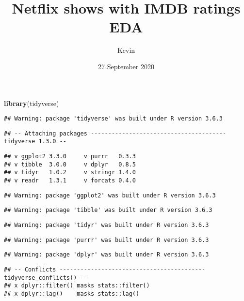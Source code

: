 \documentclass[]{article}
\title{Netflix shows with IMDB ratings EDA}
\author{Kevin}
\date{27 September 2020}
\newenvironment{Shaded}{\begin{snugshade}}{\end{snugshade}}
\newcommand{\KeywordTok}[1]{\textcolor[rgb]{0.13,0.29,0.53}{\textbf{#1}}}
\newcommand{\NormalTok}[1]{#1}
\begin{document}
\maketitle

\begin{Shaded}
\begin{Highlighting}[]
\KeywordTok{library}\NormalTok{(tidyverse)}
\end{Highlighting}
\end{Shaded}

\begin{verbatim}
## Warning: package 'tidyverse' was built under R version 3.6.3
\end{verbatim}

\begin{verbatim}
## -- Attaching packages --------------------------------------- tidyverse 1.3.0 --
\end{verbatim}

\begin{verbatim}
## v ggplot2 3.3.0     v purrr   0.3.3
## v tibble  3.0.0     v dplyr   0.8.5
## v tidyr   1.0.2     v stringr 1.4.0
## v readr   1.3.1     v forcats 0.4.0
\end{verbatim}

\begin{verbatim}
## Warning: package 'ggplot2' was built under R version 3.6.3
\end{verbatim}

\begin{verbatim}
## Warning: package 'tibble' was built under R version 3.6.3
\end{verbatim}

\begin{verbatim}
## Warning: package 'tidyr' was built under R version 3.6.3
\end{verbatim}

\begin{verbatim}
## Warning: package 'purrr' was built under R version 3.6.3
\end{verbatim}

\begin{verbatim}
## Warning: package 'dplyr' was built under R version 3.6.3
\end{verbatim}

\begin{verbatim}
## -- Conflicts ------------------------------------------ tidyverse_conflicts() --
## x dplyr::filter() masks stats::filter()
## x dplyr::lag()    masks stats::lag()
\end{verbatim}
\end{document}
